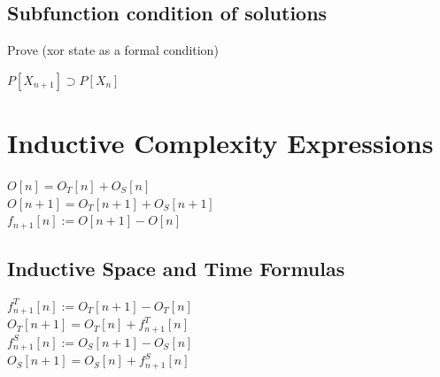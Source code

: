 \documentclass[11pt]{article}
\begin{document}
\subsection{Subfunction condition of solutions}
Prove (xor state as a formal condition)
\begin{center}
$P[X_{n+1}] \supset P[X_n]$
\end{center}

\section{Inductive Complexity Expressions}
\begin{center}
\vspace{3mm}
$
O[n] = O_T[n] + O_S[n]
$
\\ \vspace{2mm}
$
O[n+1] = O_T[n+1] + O_S[n+1]
$
\\ \vspace{4mm}
$
f_{n+1}[n] := O[n+1] - O[n]
$
\end{center}










\subsection{Inductive Space and Time Formulas}
\begin{center}
$
f^T_{n+1}[n] := O_T[n+1] - O_T[n]
$
\\ \vspace{2mm}
$
O_T[n+1] = O_T[n] + f^T_{n+1}[n]
$
\\ \vspace{2mm}
$
f^S_{n+1}[n] := O_S[n+1] - O_S[n]
$
\\ \vspace{2mm}
$
O_S[n+1] = O_S[n] + f^S_{n+1}[n]
$

\end{center}





\end{document}
